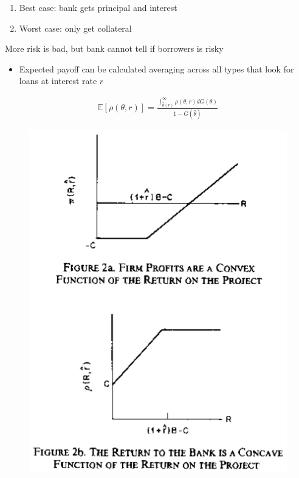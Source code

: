 \documentclass{beamer}
\begin{document}
\begin{frame}
 \begin{enumerate}
   \item Best case: bank gets principal and interest
   \item Worst case: only get collateral
 \end{enumerate}
 \medskip
 More risk is bad, but bank cannot tell if borrowers is risky
 \begin{itemize}
   \item Expected payoff can be calculated averaging across all types that look for loans at interest rate $r$
 \end{itemize}
\begin{align}
  \mathbb{E}[\rho(\theta,r)]=\frac{\int_{\hat{\theta}(r)}^{\infty}\rho(\theta,r)dG(\theta)}{1-G(\hat{\theta})}
\end{align}
\end{frame}

\begin{frame}
  \begin{figure}
    \includegraphics{stiglitz_weiss2.eps}
  \end{figure}
\end{frame}
\end{document}

